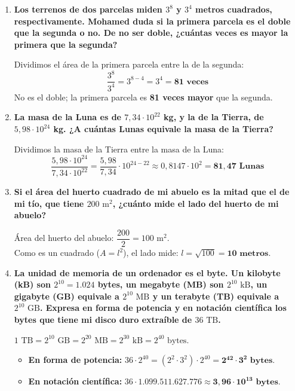 \documentclass[a4paper,12pt]{article}
\begin{document}
\begin{enumerate}
    \item \textbf{Los terrenos de dos parcelas miden $3^{8}$ y $3^{4}$ metros cuadrados, respectivamente. Mohamed duda si la primera parcela es el doble que la segunda o no. De no ser doble, ¿cuántas veces es mayor la primera que la segunda?}
        \begin{solucion}
            Dividimos el área de la primera parcela entre la de la segunda:
            $$\dfrac{3^{8}}{3^{4}} = 3^{8-4} = 3^{4} = \mathbf{81\text{ veces}}$$
            No es el doble; la primera parcela es \textbf{81 veces mayor} que la segunda.
        \end{solucion}

    \item \textbf{La masa de la Luna es de $7,34 \cdot 10^{22}$ kg, y la de la Tierra, de $5,98 \cdot 10^{24}$ kg. ¿A cuántas Lunas equivale la masa de la Tierra?}
        \begin{solucion}
            Dividimos la masa de la Tierra entre la masa de la Luna:
            $$\dfrac{5,98 \cdot 10^{24}}{7,34 \cdot 10^{22}} = \dfrac{5,98}{7,34} \cdot 10^{24-22} \approx 0,8147 \cdot 10^{2} = \mathbf{81,47\text{ Lunas}}$$
        \end{solucion}

    \item \textbf{Si el área del huerto cuadrado de mi abuelo es la mitad que el de mi tío, que tiene $200\text{ m}^{2}$, ¿cuánto mide el lado del huerto de mi abuelo?}
        \begin{solucion}
            Área del huerto del abuelo: $\dfrac{200}{2} = 100\text{ m}^{2}$. \\
            Como es un cuadrado ($A = l^{2}$), el lado mide: $l = \sqrt{100} = \mathbf{10\text{ metros}}$.
        \end{solucion}

    \item \textbf{La unidad de memoria de un ordenador es el byte. Un kilobyte (kB) son $2^{10} = 1.024$ bytes, un megabyte (MB) son $2^{10}\text{ kB}$, un gigabyte (GB) equivale a $2^{10}\text{ MB}$ y un terabyte (TB) equivale a $2^{10}\text{ GB}$. Expresa en forma de potencia y en notación científica los bytes que tiene mi disco duro extraíble de $36\text{ TB}$.}
        \begin{solucion}
            $1\text{ TB} = 2^{10}\text{ GB} = 2^{20}\text{ MB} = 2^{30}\text{ kB} = 2^{40}\text{ bytes}$.
            \begin{itemize}
                \item \textbf{En forma de potencia:} $36 \cdot 2^{40} = (2^{2} \cdot 3^{2}) \cdot 2^{40} = \mathbf{2^{42} \cdot 3^{2}\text{ bytes}}$.
                \item \textbf{En notación científica:} $36 \cdot 1.099.511.627.776 \approx \mathbf{3,96 \cdot 10^{13}\text{ bytes}}$.
            \end{itemize}
        \end{solucion}


\end{enumerate}
\end{document}
